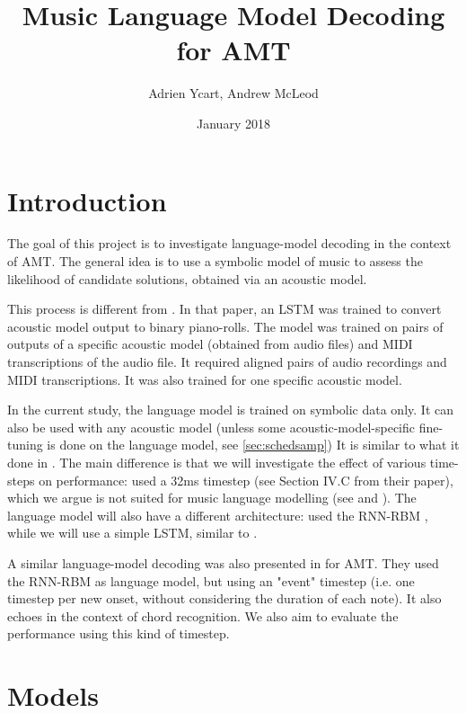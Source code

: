 \documentclass{article}
\title{Music Language Model Decoding for AMT}
\author{Adrien Ycart, Andrew McLeod}
\date{January 2018}
\begin{document}
\maketitle

\section{Introduction}

The goal of this project is to investigate language-model decoding in the context of AMT.
The general idea is to use a symbolic model of music to assess the likelihood of candidate solutions, obtained via an acoustic model.

This process is different from \citep{ycart2018polyphonic}.
In that paper, an LSTM was trained to convert acoustic model output to binary piano-rolls.
The model was trained on pairs of outputs of a specific acoustic model (obtained from audio files) and MIDI transcriptions of the audio file.
It required aligned pairs of audio recordings and MIDI transcriptions.
It was also trained for one specific acoustic model.

In the current study, the language model is trained on symbolic data only.
It can also be used with any acoustic model (unless some acoustic-model-specific fine-tuning is done on the language model, see \ref{sec:schedsamp})
It is similar to what it done in \citep{sigtia2016end}.
The main difference is that we will investigate the effect of various time-steps on performance:
 \cite{sigtia2016end} used a 32ms timestep (see Section IV.C from their paper), which we argue is not suited for music language modelling (see \citep{Ycart2017} and \citep{Korzeniowski2017}).
The language model will also have a different architecture: 
\citep{sigtia2016end} used the RNN-RBM \citep{Boulanger-Lewandowski2012}, while we will use a simple LSTM, similar to \citep{Ycart2017}.

A similar language-model decoding was also presented in \citep{app8030470} for AMT.
They used the RNN-RBM as language model, but using an "event" timestep (i.e. one timestep per new onset, without considering the duration of each note).
It also echoes \citep{Korzeniowski2018} in the context of chord recognition.
We also aim to evaluate the performance using this kind of timestep.

\section{Models}
\end{document}
